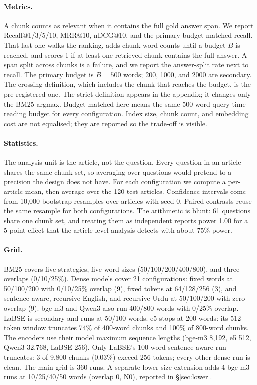 \documentclass[11pt]{article}
\begin{document}
\paragraph{Metrics.}
A chunk counts as relevant when it contains the full gold answer span. We report Recall@1/3/5/10,
MRR@10, nDCG@10, and the primary budget-matched recall. That last one walks the ranking, adds chunk
word counts until a budget $B$ is reached, and scores 1 if at least one retrieved chunk contains the
full answer. A span split across chunks is a failure, and we report the answer-split rate next to
recall. The primary budget is $B=500$ words; 200, 1000, and 2000 are secondary. The crossing
definition, which includes the chunk that reaches the budget, is the pre-registered one. The strict
definition appears in the appendix; it changes only the BM25 argmax. Budget-matched here means the
same 500-word query-time reading budget for every configuration. Index size, chunk count, and
embedding cost are not equalised; they are reported so the trade-off is visible.

\paragraph{Statistics.}
The analysis unit is the article, not the question. Every question in an article shares the same
chunk set, so averaging over questions would pretend to a precision the design does not have. For
each configuration we compute a per-article mean, then average over the 120 test articles.
Confidence intervals come from 10{,}000 bootstrap resamples over articles with seed 0. Paired
contrasts reuse the same resample for both configurations. The arithmetic is blunt: 61 questions share one chunk
set, and treating them as independent reports power 1.00 for a 5-point effect that the article-level
analysis detects with about 75\% power.

\paragraph{Grid.}
BM25 covers five strategies, five word sizes (50/100/200/400/800), and three overlaps (0/10/25\%).
Dense models cover 21 configurations: fixed words at 50/100/200 with 0/10/25\% overlap (9), fixed
tokens at 64/128/256 (3), and sentence-aware, recursive-English, and recursive-Urdu at 50/100/200
with zero overlap (9). bge-m3 and Qwen3 also run 400/800 words with 0/25\% overlap. LaBSE is
secondary and runs at 50/100 words. e5 stops at 200 words: its 512-token window truncates 74\% of
400-word chunks and 100\% of 800-word chunks. The encoders use their model maximum sequence lengths
(bge-m3 8{,}192, e5 512, Qwen3 32{,}768, LaBSE 256). Only LaBSE's 100-word sentence-aware run
truncates: 3 of 9{,}800 chunks (0.03\%) exceed 256 tokens; every other dense run is clean. The main
grid is 360 runs. A separate lower-size extension adds 4 bge-m3 runs at 10/25/40/50 words (overlap
0, N0), reported in \S\ref{sec:lower}.
\end{document}
